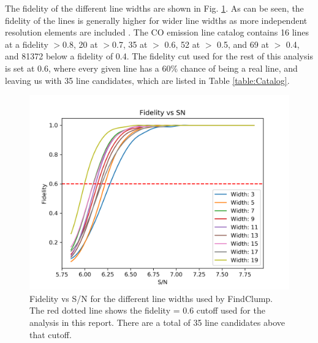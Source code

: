 The fidelity of the different line widths are shown in Fig. \ref{fig:Fid_map}. As can be seen, the fidelity of the lines is generally higher for wider line widths as more independent resolution elements are included \cite{decarli2019alma}. The CO emission line catalog contains 16 lines at a fidelity $>$0.8, 20 at $>$0.7, 35 at $>$ 0.6, 52 at $>$ 0.5, and 69 at $>$ 0.4, and 81372 below a fidelity of 0.4. The fidelity cut used for the rest of this analysis is set at 0.6, where every given line has a 60\% chance of being a real line, and leaving us with 35 line candidates, which are listed in Table \ref{table:Catalog}. %

\begin{figure}[!htbp]
\centering \includegraphics[width=120mm]{Fidelity_map.png}
\caption{Fidelity vs S/N for the different line widths used by FindClump. The red dotted line shows the fidelity = 0.6 cutoff used for the analysis in this report. There are a total of 35 line candidates above that cutoff.}
\label{fig:Fid_map}
\end{figure}



